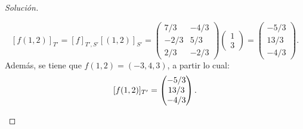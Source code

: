 \documentclass[a4,11pt]{aleph-notas}
\begin{document}
\begin{proof}[Solución]
\begin{enumerate}
    \[
        [f(1, 2)]_{T'} = [f]_{T',S'}[(1, 2)]_{S'} = \begin{pmatrix}
            7/3 & -4/3\\
            -2/3 & 5/3\\
            2/3 & -2/3
        \end{pmatrix}
        \begin{pmatrix}
            1\\
            3
        \end{pmatrix}
        =
        \begin{pmatrix}
            -5/3\\
            13/3\\
            -4/3
        \end{pmatrix}.
    \]
    Además, se tiene que $f(1, 2) = (-3, 4, 3)$, a partir lo cual:
    \[
        [f(1, 2)]_{T'} = 
        \begin{pmatrix}
            -5/3\\
            13/3\\
            -4/3
        \end{pmatrix}. \qedhere
    \]
\end{enumerate}
\end{proof}
\end{document}
